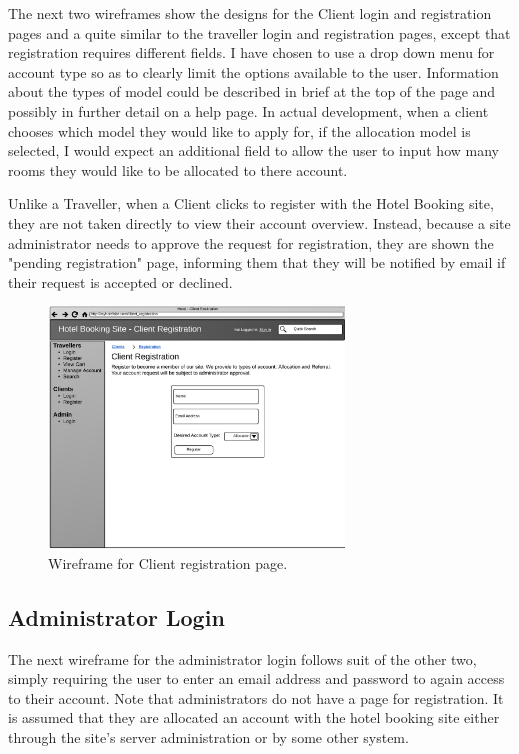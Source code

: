 \documentclass{article}
\begin{document}
The next two wireframes show the designs for the Client login and registration pages and a quite similar to the traveller login and registration pages, except that registration requires different fields. I have chosen to use a drop down menu for account type so as to clearly limit the options available to the user. Information about the types of model could be described in brief at the top of the page and possibly in further detail on a help page. In actual development, when a client chooses which model they would like to apply for, if the allocation model is selected, I would expect an additional field to allow the user to input how many rooms they would like to be allocated to there account.

Unlike a Traveller, when a Client clicks to register with the Hotel Booking site, they are not taken directly to view their account overview. Instead, because a site administrator needs to approve the request for registration, they are shown the "pending registration" page, informing them that they will be notified by email if their request is accepted or declined.

\begin{figure}[H]
\centering
\includegraphics[width=0.7\textwidth]{img/wireframes/ClientRegister.png}
\caption{Wireframe for Client registration page.}
\label{fig:wireframe-client-register}
\end{figure}

\subsection{Administrator Login}
The next wireframe for the administrator login follows suit of the other two, simply requiring the user to enter an email address and password to again access to their account. Note that administrators do not have a page for registration. It is assumed that they are allocated an account with the hotel booking site either through the site's server administration or by some other system.
\end{document}
